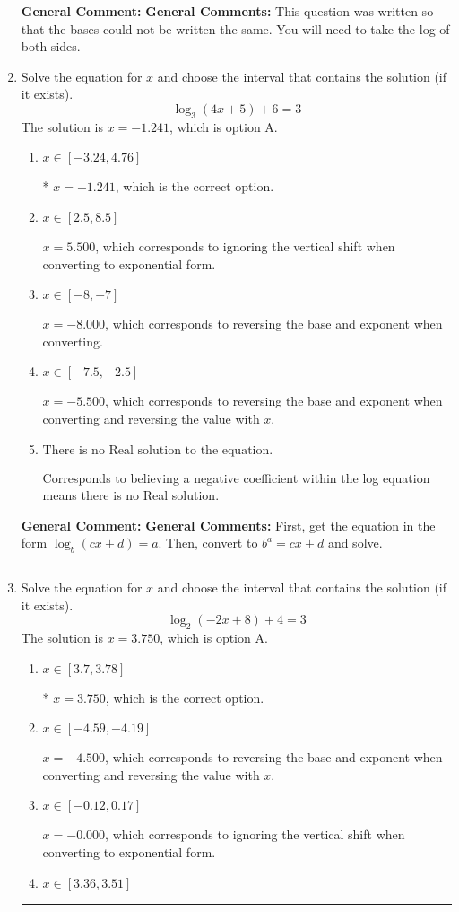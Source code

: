 \documentclass{extbook}[14pt]
\newcommand{\litem}[1]{\item #1

\rule{\textwidth}{0.4pt}}
\begin{document}
\begin{enumerate}
{\textbf{General Comment:} \textbf{General Comments:} This question was written so that the bases could not be written the same. You will need to take the log of both sides.
}
\litem{
Solve the equation for $x$ and choose the interval that contains the solution (if it exists).
\[ \log_{3}{(4x+5)}+6 = 3 \]The solution is \( x = -1.241 \), which is option A.\begin{enumerate}[label=\Alph*.]
\item \( x \in [-3.24, 4.76] \)

* $x = -1.241$, which is the correct option.
\item \( x \in [2.5, 8.5] \)

$x = 5.500$, which corresponds to ignoring the vertical shift when converting to exponential form.
\item \( x \in [-8, -7] \)

$x = -8.000$, which corresponds to reversing the base and exponent when converting.
\item \( x \in [-7.5, -2.5] \)

$x = -5.500$, which corresponds to reversing the base and exponent when converting and reversing the value with $x$.
\item \( \text{There is no Real solution to the equation.} \)

Corresponds to believing a negative coefficient within the log equation means there is no Real solution.
\end{enumerate}

\textbf{General Comment:} \textbf{General Comments:} First, get the equation in the form $\log_b{(cx+d)} = a$. Then, convert to $b^a = cx+d$ and solve.
}
\litem{
Solve the equation for $x$ and choose the interval that contains the solution (if it exists).
\[ \log_{2}{(-2x+8)}+4 = 3 \]The solution is \( x = 3.750 \), which is option A.\begin{enumerate}[label=\Alph*.]
\item \( x \in [3.7, 3.78] \)

* $x = 3.750$, which is the correct option.
\item \( x \in [-4.59, -4.19] \)

$x = -4.500$, which corresponds to reversing the base and exponent when converting and reversing the value with $x$.
\item \( x \in [-0.12, 0.17] \)

$x = -0.000$, which corresponds to ignoring the vertical shift when converting to exponential form.
\item \( x \in [3.36, 3.51] \)


\end{enumerate}}
\end{enumerate}
\end{document}
